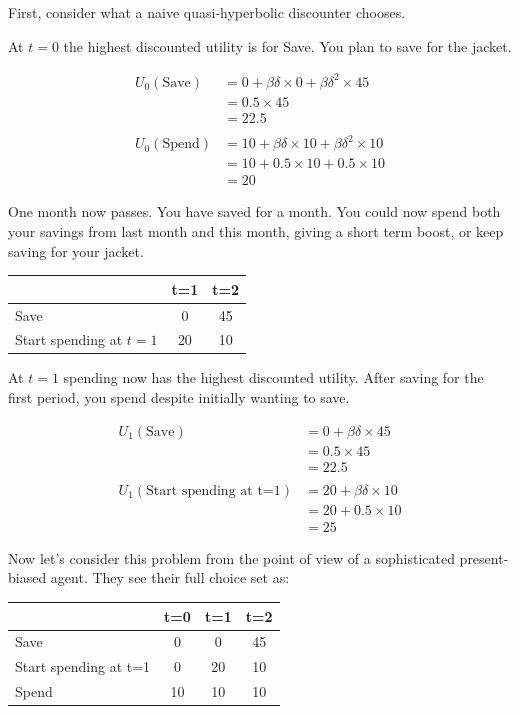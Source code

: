 \documentclass[
  letterpaper,
  DIV=11,
  numbers=noendperiod]{scrreprt}
\begin{document}
First, consider what a naive quasi-hyperbolic discounter chooses.

At \(t=0\) the highest discounted utility is for Save. You plan to save
for the jacket.

\begin{align*}
U_0(\text{Save})&=0+\beta\delta \times 0+\beta\delta^2\times 45 \\
&=0.5\times 45 \\
&=22.5 \\
\\
U_0(\text{Spend})&=10+\beta\delta \times 10+\beta\delta^2\times 10 \\
&=10+0.5\times 10+0.5\times 10 \\
&=20
\end{align*}

One month now passes. You have saved for a month. You could now spend
both your savings from last month and this month, giving a short term
boost, or keep saving for your jacket.

\begin{longtable}[]{@{}lcc@{}}
\toprule()
& t=1 & t=2 \\
\midrule()
\endhead
Save & 0 & 45 \\
Start spending at \(t=1\) & 20 & 10 \\
\bottomrule()
\end{longtable}

At \(t=1\) spending now has the highest discounted utility. After saving
for the first period, you spend despite initially wanting to save.

\begin{align*}
U_1(\text{Save})&=0+\beta\delta\times 45 \\
&=0.5\times 45 \\
&=22.5 \\
\\
U_1(\text{Start spending at t=1})&=20+\beta\delta \times 10 \\
&=20+0.5\times 10 \\
&=25
\end{align*}

Now let's consider this problem from the point of view of a
sophisticated present-biased agent. They see their full choice set as:

\begin{longtable}[]{@{}lccc@{}}
\toprule()
& t=0 & t=1 & t=2 \\
\midrule()
\endhead
Save & 0 & 0 & 45 \\
Start spending at t=1 & 0 & 20 & 10 \\
Spend & 10 & 10 & 10 \\
\bottomrule()
\end{longtable}
\end{document}
